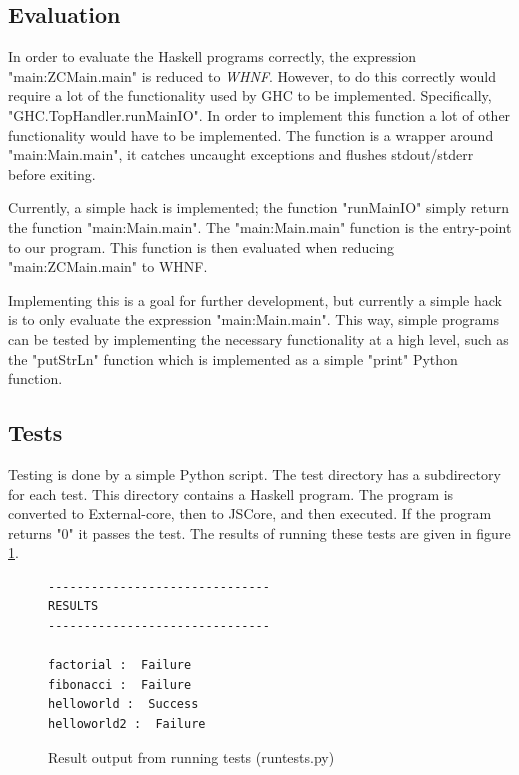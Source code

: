 \subsection{Evaluation}
\begin{sloppypar}
In order to evaluate the Haskell programs correctly, the expression "main:ZCMain.main" 
is reduced to \emph{WHNF}. However, to do this correctly would require a lot of 
the functionality used by GHC
to be implemented. Specifically, "GHC.TopHandler.runMainIO". 
In order to implement this function
a lot of other functionality would have to be implemented. 
The function is a wrapper around 
"main:Main.main", it catches uncaught exceptions and flushes stdout/stderr 
before exiting. 
\end{sloppypar}

Currently, a simple hack is implemented; the function "runMainIO" simply return 
the function "main:Main.main".
The "main:Main.main" function is the entry-point to our program. This function 
is then evaluated when reducing "main:ZCMain.main" to WHNF.

Implementing this is a goal for further
development, but currently a simple hack is to only evaluate the expression 
"main:Main.main". This way,
simple programs can be tested by implementing the necessary functionality 
at a high level, such as the
"putStrLn" function which is implemented as a simple "print" Python function.

\subsection{Tests}

Testing is done by a simple Python script. The test directory has a subdirectory 
for each test. This directory
contains a Haskell program. The program is converted to External-core, then 
to JSCore, and then executed.
If the program returns "0" it passes the test. The results of running these 
tests are given in figure \ref{tests}.


\begin{figure}[H]
\begin{center}
\begin{minipage}{0.45\textwidth}
\begin{lstlisting}
-------------------------------
RESULTS
-------------------------------

factorial :  Failure
fibonacci :  Failure
helloworld :  Success
helloworld2 :  Failure
\end{lstlisting}
\end{minipage}
\end{center}
\caption[Result output from running tests]{Result output from running tests (runtests.py)}
\label{tests}
\end{figure}

